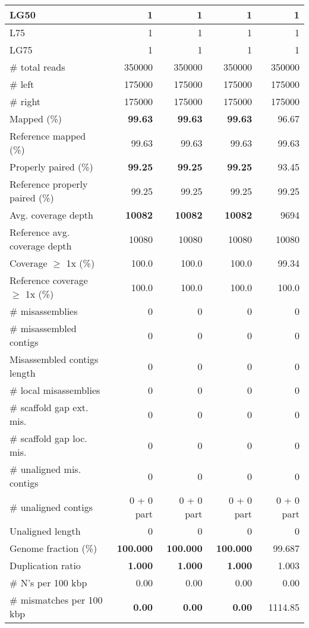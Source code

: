 \documentclass[12pt,a4paper]{article}
\begin{document}
\begin{table}[ht]
\begin{center}
\begin{tabular}{|l*{4}{|r}|}
LG50 & 1 & 1 & 1 & 1 \\ \hline
L75 & 1 & 1 & 1 & 1 \\ \hline
LG75 & 1 & 1 & 1 & 1 \\ \hline
\# total reads & 350000 & 350000 & 350000 & 350000 \\ \hline
\# left & 175000 & 175000 & 175000 & 175000 \\ \hline
\# right & 175000 & 175000 & 175000 & 175000 \\ \hline
Mapped (\%) & {\bf 99.63} & {\bf 99.63} & {\bf 99.63} & 96.67 \\ \hline
Reference mapped (\%) & 99.63 & 99.63 & 99.63 & 99.63 \\ \hline
Properly paired (\%) & {\bf 99.25} & {\bf 99.25} & {\bf 99.25} & 93.45 \\ \hline
Reference properly paired (\%) & 99.25 & 99.25 & 99.25 & 99.25 \\ \hline
Avg. coverage depth & {\bf 10082} & {\bf 10082} & {\bf 10082} & 9694 \\ \hline
Reference avg. coverage depth & 10080 & 10080 & 10080 & 10080 \\ \hline
Coverage $\geq$ 1x (\%) & 100.0 & 100.0 & 100.0 & 99.34 \\ \hline
Reference coverage $\geq$ 1x (\%) & 100.0 & 100.0 & 100.0 & 100.0 \\ \hline
\# misassemblies & 0 & 0 & 0 & 0 \\ \hline
\# misassembled contigs & 0 & 0 & 0 & 0 \\ \hline
Misassembled contigs length & 0 & 0 & 0 & 0 \\ \hline
\# local misassemblies & 0 & 0 & 0 & 0 \\ \hline
\# scaffold gap ext. mis. & 0 & 0 & 0 & 0 \\ \hline
\# scaffold gap loc. mis. & 0 & 0 & 0 & 0 \\ \hline
\# unaligned mis. contigs & 0 & 0 & 0 & 0 \\ \hline
\# unaligned contigs & 0 + 0 part & 0 + 0 part & 0 + 0 part & 0 + 0 part \\ \hline
Unaligned length & 0 & 0 & 0 & 0 \\ \hline
Genome fraction (\%) & {\bf 100.000} & {\bf 100.000} & {\bf 100.000} & 99.687 \\ \hline
Duplication ratio & {\bf 1.000} & {\bf 1.000} & {\bf 1.000} & 1.003 \\ \hline
\# N's per 100 kbp & 0.00 & 0.00 & 0.00 & 0.00 \\ \hline
\# mismatches per 100 kbp & {\bf 0.00} & {\bf 0.00} & {\bf 0.00} & 1114.85 \\ \hline

\end{tabular}
\end{center}
\end{table}
\end{document}
